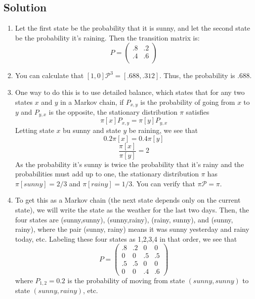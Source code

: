 \documentclass{article}
\begin{document}
\subsection*{Solution}
  \begin{enumerate}[label=(\alph*)]
    \item Let the first state be the probability that it is sunny, and let the second state be the probability it's raining. Then the
      transition matrix is:
      \[ P = \left(
        \begin{array}{cc}
          .8 & .2\\
          .4 & .6\\
        \end{array}
      \right) \]
    \item
      You can calculate that $[1,0] \mathcal{P}^3 = [.688 , .312]$. Thus, the
      probability is .688.
      \item One way to do this is to use detailed balance, which states that for any two states $x$ and $y$ in a Markov chain, if $P_{x,y}$ is the probability of going from $x$ to $y$ and $P_{y,x}$ is the opposite, the stationary distribution $\pi$ satisfies
      $$\pi[x] P_{x,y} = \pi[y] P_{y,x}$$
      Letting state $x$ bu sunny and state $y$ be raining, we see that 
      $$0.2 \pi[x] = 0.4 \pi[y]$$
      $$\frac{\pi[x]}{\pi[y]} = 2$$
      As the probability it's sunny is twice the probability that it's rainy and the probabilities must add up to one, the stationary distribution $\pi$ has $\pi[sunny] = 2/3$ and $\pi[rainy] = 1/3$. You can verify that $\pi \mathcal{P} = \pi$. 
    \item
      To get this as a Markov chain (the next state depends only on the current state), we will
      write the state as the weather for the last two days. Then, the four states
      are (sunny,sunny), (sunny,rainy), (rainy, sunny), and (sunny, rainy), where the pair (sunny, rainy) means it was sunny yesterday and rainy today, etc. Labeling these four states as 1,2,3,4 in that order, we see that
      \[ P = \left(
        \begin{array}{cccc}
          .8 & .2 & 0 & 0\\
          0 & 0 & .5 & .5\\
          .5 & .5 & 0 & 0\\
          0 & 0 & .4 & .6
        \end{array}
      \right) \]
      where $P_{1,2} = 0.2$ is the probability of moving from state $(sunny, sunny)$ to state $(sunny, rainy)$, etc.
  \end{enumerate}
\end{document}
